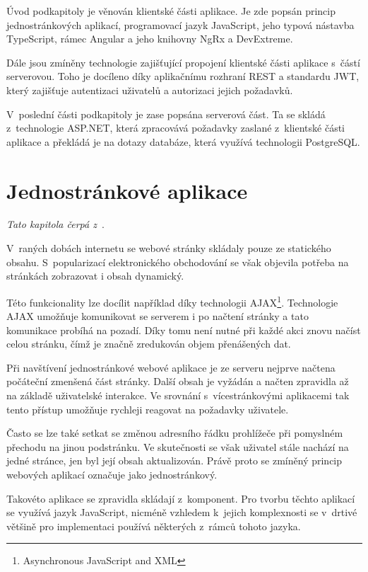 Úvod podkapitoly je věnován klientské části aplikace. Je zde popsán princip jednostránkových aplikací, programovací jazyk JavaScript, jeho typová nástavba TypeScript, rámec Angular a jeho knihovny NgRx a DevExtreme.

Dále jsou zmíněny technologie zajišťující propojení klientské části aplikace s~částí serverovou. Toho je docíleno díky aplikačnímu rozhraní REST a standardu JWT, který zajišťuje autentizaci uživatelů a autorizaci jejich požadavků.

V~poslední části podkapitoly je zase popsána serverová část. Ta se skládá z~technologie ASP.NET, která zpracovává požadavky zaslané z~klientské části aplikace a překládá je na dotazy databáze, která využívá technologii PostgreSQL.


\section{Jednostránkové aplikace}\label{sec:spa}

\emph{Tato kapitola čerpá z~\cite{bib:spa}}.

V~raných dobách internetu se webové stránky skládaly pouze ze statického obsahu. S~popularizací elektronického obchodování se však objevila potřeba na stránkách zobrazovat i obsah dynamický. 

Této funkcionality lze docílit například díky technologii AJAX\footnote{Asynchronous JavaScript and XML}. Technologie AJAX umožňuje komunikovat se serverem i po načtení stránky a tato komunikace probíhá na pozadí. Díky tomu není nutné při každé akci znovu načíst celou stránku, čímž je značně zredukován objem přenášených dat.

Při navštívení jednostránkové webové aplikace je ze serveru nejprve načtena počáteční zmenšená část stránky. Další obsah je vyžádán a načten zpravidla až na základě uživatelské interakce. Ve srovnání s~vícestránkovými aplikacemi tak tento přístup umožňuje rychleji reagovat na požadavky uživatele.

Často se lze také setkat se změnou adresního řádku prohlížeče při pomyslném přechodu na jinou podstránku. Ve skutečnosti se však uživatel stále nachází na jedné stránce, jen byl její obsah aktualizován. Právě proto se zmíněný princip webových aplikací označuje jako jednostránkový.

Takovéto aplikace se zpravidla skládají z~komponent. Pro tvorbu těchto aplikací se využívá jazyk JavaScript, nicméně vzhledem k~jejich komplexnosti se v~drtivé většině pro implementaci používá některých z~rámců tohoto jazyka.



